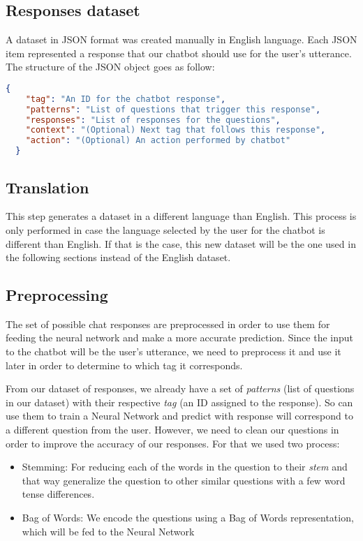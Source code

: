 \documentclass[]{article}
\begin{document}
\subsection{Responses dataset}
A dataset in JSON format was created manually in English language. Each JSON item represented a response that our chatbot should use for the user's utterance. The structure of the JSON object goes as follow:

\begin{lstlisting}[language=json,firstnumber=1, caption=JSON object for a chatbot response]
  {
    "tag": "An ID for the chatbot response",
    "patterns": "List of questions that trigger this response",
    "responses": "List of responses for the questions",
    "context": "(Optional) Next tag that follows this response",
    "action": "(Optional) An action performed by chatbot"
  }
\end{lstlisting}

\subsection{Translation}
This step generates a dataset in a different language than English. This process is only performed in case the language selected by the user for the chatbot is different than English. If that is the case, this new dataset will be the one used in the following sections instead of the English dataset.

\subsection{Preprocessing}
The set of possible chat responses are preprocessed in order to use them for feeding the neural network and make a more accurate prediction. Since the input to the chatbot will be the user's utterance, we need to preprocess it and use it later in order to determine to which tag it corresponds.

From our dataset of responses, we already have a set of \emph{patterns} (list of questions in our dataset) with their respective \emph{tag} (an ID assigned to the response). So can use them to train a Neural Network and predict with response will correspond to a different question from the user. However, we need to clean our questions in order to improve the accuracy of our responses. For that we used two process:

\begin{itemize}
  \item{Stemming:} For reducing each of the words in the question to their \emph{stem} and that way generalize the question to other similar questions with a few word tense differences.
  \item{Bag of Words:} We encode the questions using a Bag of Words representation, which will be fed to the Neural Network
\end{itemize}
\end{document}
